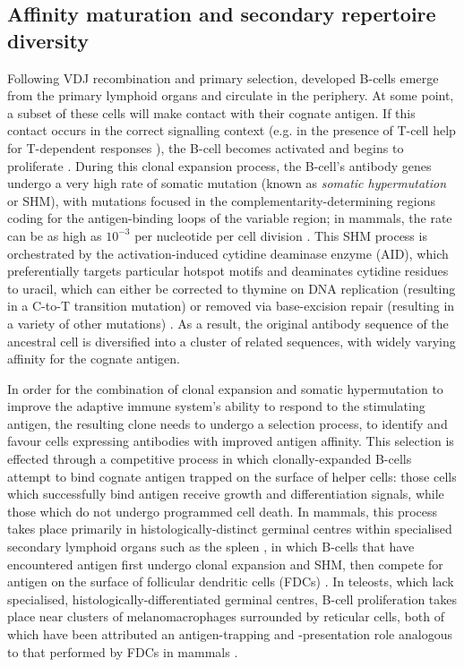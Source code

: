 \subsection{Affinity maturation and secondary repertoire diversity}
\label{sec:intro_affinity_maturation}

Following VDJ recombination and primary selection, developed \naive B-cells emerge from the primary lymphoid organs and circulate in the periphery. At some point, a subset of these \naive cells will make contact with their cognate antigen. If this contact occurs in the correct signalling context (e.g. in the presence of T-cell help for T-dependent responses \parencite{sompayrac2019immune}), the B-cell becomes activated and begins to proliferate \parencite{dunnwalters2010bcellageing}. During this clonal expansion process, the B-cell's antibody genes undergo a very high rate of somatic mutation (known as \textit{somatic hypermutation} or SHM), with mutations focused in the complementarity-determining regions coding for the antigen-binding loops of the variable region; in mammals, the rate can be as high as $10^{-3}$ per nucleotide per cell division \parencite{noia2007shm}. This SHM process is orchestrated by the activation-induced cytidine deaminase enzyme (AID), which preferentially targets particular hotspot motifs and deaminates cytidine residues to uracil, which can either be corrected to thymine on DNA replication (resulting in a C-to-T transition mutation) or removed via base-excision repair (resulting in a variety of other mutations) \parencite{magor2015affinity}. As a result, the original antibody sequence of the ancestral \naive cell is diversified into a cluster of related sequences, with widely varying affinity for the cognate antigen.

In order for the combination of clonal expansion and somatic hypermutation to improve the adaptive immune system's ability to respond to the stimulating antigen, the resulting clone needs to undergo a selection process, to identify and favour cells expressing antibodies with improved antigen affinity. This selection is effected through a competitive process in which clonally-expanded B-cells attempt to bind cognate antigen trapped on the surface of helper cells: those cells which successfully bind antigen receive growth and differentiation signals, while those which do not undergo programmed cell death. In mammals, this process takes place primarily in histologically-distinct germinal centres within specialised secondary lymphoid organs such as the spleen \parencite{victora2012gc}, in which B-cells that have encountered antigen first undergo clonal expansion and SHM, then compete for antigen on the surface of follicular dendritic cells (FDCs) \parencite{howard2006quality,victora2012gc}. In teleosts, which lack specialised, histologically-differentiated germinal centres, B-cell proliferation takes place near clusters of melanomacrophages surrounded by reticular cells, both of which have been attributed an antigen-trapping and -presentation role analogous to that performed by FDCs in mammals \parencite{magor2015affinity}.

